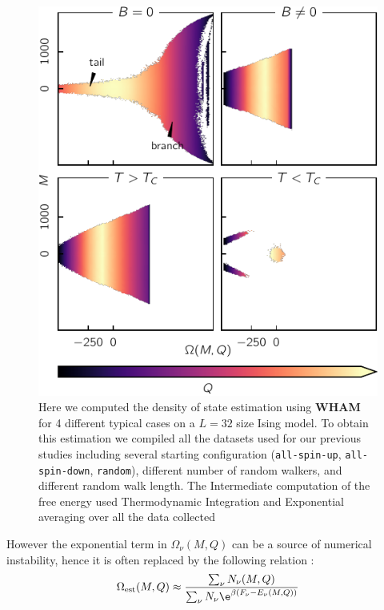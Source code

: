 \documentclass[ansiapaper]{report}
\begin{document}
\begin{multicols}{3}
\begin{figure}[H] 
    \begin{center}
        \hspace*{-.2cm}\includegraphics[width=1.05\linewidth]{figures/density_omega.pdf}
    \end{center}
    \caption{Here we computed the density of state estimation using \textbf{WHAM} for 4 different typical cases on a $L = 32$ size Ising model. To obtain this estimation we compiled all the datasets used for our previous studies including several starting configuration (\texttt{all-spin-up}, \texttt{all-spin-down}, \texttt{random}), different number of random walkers, and different random walk length. The Intermediate computation of the free energy used Thermodynamic Integration and Exponential averaging over all the data collected
    }
    \label{fig:density-states}
\end{figure}
However the exponential term in $\Omega_{\nu}(M,Q)$ can be a source of numerical instability, hence it is often replaced by the following relation : 
    \begin{equation*}
        \Omega_{\text{est}}(M,Q) \approx \frac{\sum_{\nu} N_{\nu}(M,Q)}
        {\sum_{\nu} N_{\nu} \e^{\beta(F_{\nu}- E_{\nu}(M,Q))}}
        \label{eq:WHAM2}
    \end{equation*}


\end{multicols}
\end{document}
